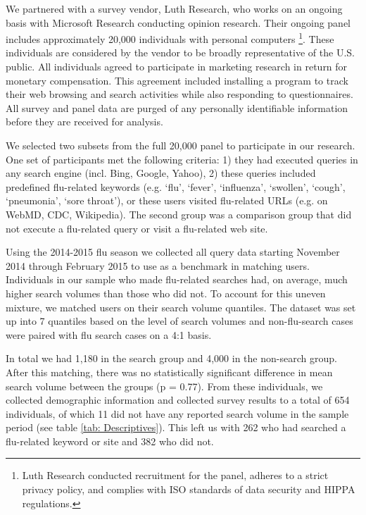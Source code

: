 \documentclass[12pt]{article}
\begin{document}
We partnered with a survey vendor, Luth Research, who works on an ongoing basis with Microsoft Research conducting opinion research. Their ongoing panel includes approximately 20,000 individuals with personal computers  \footnote{Luth Research conducted recruitment for the panel, adheres to a strict privacy policy, and complies with ISO standards of data security and HIPPA regulations.}. These individuals are considered by the vendor to be broadly representative of the U.S. public. All individuals agreed to participate in marketing research in return for monetary compensation. This agreement included installing a program to track their web browsing and search activities while also responding to questionnaires. All survey and panel data are purged of any personally identifiable information before they are received for analysis. 

We selected two subsets from the full 20,000 panel to participate in our research. One set of participants met the following criteria: 1) they had executed queries in any search engine (incl. Bing, Google, Yahoo), 2) these queries included predefined flu-related keywords (e.g. `flu', `fever', `influenza', `swollen', `cough', `pneumonia', `sore throat'), or these users visited flu-related URLs (e.g. on WebMD, CDC, Wikipedia). The second group was a comparison group that did not execute a flu-related query or visit a flu-related web site. 

Using the 2014-2015 flu season we collected all query data starting November 2014 through February 2015 to use as a benchmark in matching users. Individuals in our sample who made flu-related searches had, on average, much higher search volumes than those who did not. To account for this uneven mixture, we matched users on their search volume quantiles. The dataset was set up into 7 quantiles based on the level of search volumes and non-flu-search cases were paired with flu search cases on a 4:1 basis. 

In total we had 1,180 in the search group and 4,000 in the non-search group. After this matching, there was no statistically significant difference in mean search volume between the groups (p = 0.77). From these individuals, we collected demographic information and collected survey results to a total of 654 individuals, of which 11 did not have any reported search volume in the sample period (see table \ref{tab: Descriptives}). This left us with 262 who had searched a flu-related keyword or site and 382 who did not. 
\end{document}
